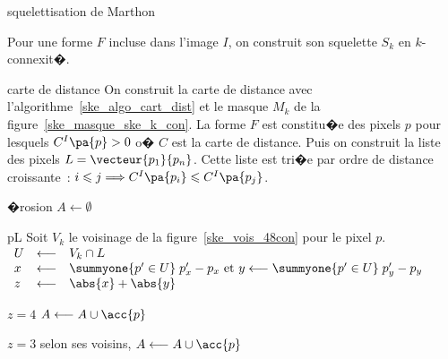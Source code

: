         \begin{xalgorithm}{squelettisation de Marthon}
        \label{ske_algo_ske_ero_algo_marthon}
        
        Pour une forme $F$ incluse dans l'image $I$, on construit son squelette $S_k$ en $k$-connexit�.
        
        \begin{xalgostep}{carte de distance}
                On construit la carte de distance avec l'algorithme~\ref{ske_algo_cart_dist} et le masque $M_k$ de la
                figure~\ref{ske_masque_ske_k_con}. La forme $F$ est constitu�e des pixels 
                $p$ pour lesquels $C^I\pa{p} > 0$ o� 
                $C$ est la carte de distance. Puis on construit la liste des pixels $L=\vecteur{p_1}{p_n}$. 
                Cette liste est tri�e 
                par ordre de distance croissante~: $i \leqslant j \Longrightarrow C^I\pa{p_i} \leqslant C^I\pa{p_j}$.
        \end{xalgostep}
        
        \begin{xalgostep}{�rosion}\label{ske_algo_ske_2_a}
                $A \longleftarrow \emptyset$ \\
                \begin{xforeach}{p}{L}
                    Soit $V_k$ le voisinage de la figure~\ref{ske_vois_48con} pour le pixel $p$.\\
                    $\begin{array}{lll}
                    U &\longleftarrow& V_k \cap L \\
                    x &\longleftarrow& \summyone{p' \in U} \; p'_x - p_x \text{ et }    
                                y \longleftarrow \summyone{p' \in U} \; p'_y - p_y \\
                    z &\longleftarrow& \abs{x} + \abs{y}
                    \end{array}$ \\
                    \begin{xif}{$z = 4$}
                        $A \longleftarrow A \cup \acc{p}$ 
                    \xelse
                        \begin{xif}{$z = 3$}
                            selon ses voisins, $A \longleftarrow A \cup \acc{p}$
                        \end{xif}
                    \end{xif}
                \end{xforeach}
        \end{xalgostep}
        

\end{xalgorithm}

